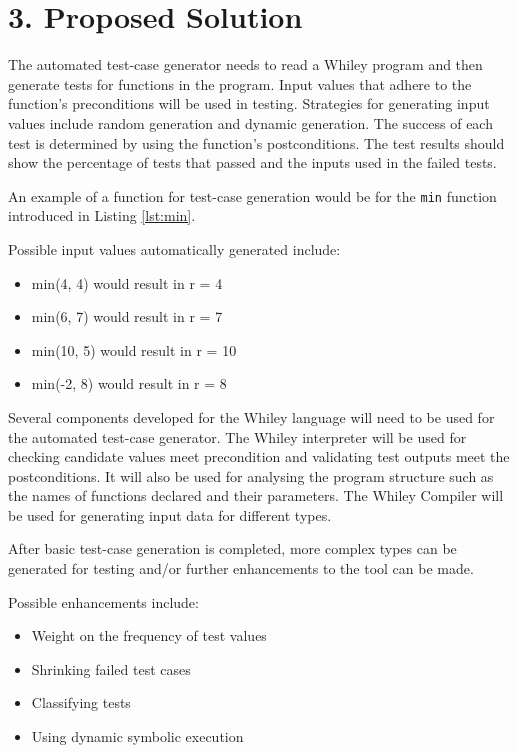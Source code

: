 \documentclass[11pt, a4paper, twoside, openright]{report}
\begin{document}
\section*{3. Proposed Solution}

The automated test-case generator needs to read a Whiley program and then generate tests for functions in the program. 
Input values that adhere to the function's preconditions will be used in testing. Strategies for generating input values include random generation and dynamic generation.
The success of each test is determined by using the function's postconditions. 
The test results should show the percentage of tests that passed and the inputs used in the failed tests.

An example of a function for test-case generation would be for the \texttt{min} function introduced in Listing \ref{lst:min}. 

Possible input values automatically generated include:
\begin{itemize}
	\item min(4, 4) would result in r = 4
	\item min(6, 7) would result in r = 7
	\item min(10, 5) would result in r = 10
	\item min(-2, 8) would result in r = 8
\end{itemize}

Several components developed for the Whiley language will need to be used for the automated test-case generator. 
The Whiley interpreter will be used for checking candidate values meet precondition and validating test outputs meet the postconditions. It will also be used for analysing the program structure such as the names of functions declared and their parameters. 
The Whiley Compiler will be used for generating input data for different types.

After basic test-case generation is completed, more complex types can be generated for testing and/or further enhancements to the tool can be made. 

Possible enhancements include:
\begin{itemize}
	\item Weight on the frequency of test values
	\item Shrinking failed test cases
	\item Classifying tests
	\item Using dynamic symbolic execution
\end{itemize} 
\end{document}

